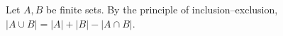 Let $A, B$ be finite sets.
By the principle of inclusion–exclusion, $\lvert A \cup B \rvert = \lvert A \rvert + \lvert B \rvert - \lvert A \cap B \rvert$.